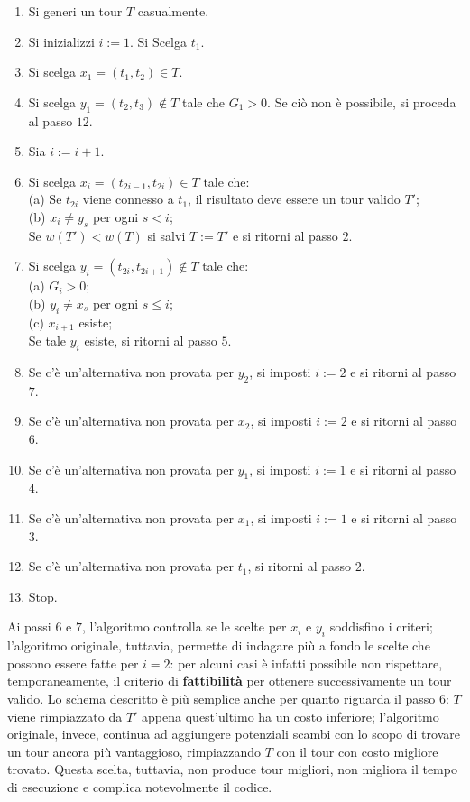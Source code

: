 \begin{algorithm}[H]
\caption{}
\begin{enumerate}
    \item Si generi un tour $T$ casualmente.
    \item Si inizializzi $i:=1$. Si Scelga $t_1$.
    \item Si scelga $x_1=(t_1,t_2) \in T$.
    \item Si scelga $y_1=(t_2, t_3) \notin T$ tale che $G_1>0$. Se ciò non è possibile, si proceda al passo $12$.
    \item Sia $i:=i+1$.
    \item Si scelga $x_i=(t_{2i-1}, t_{2i}) \in T$ tale che:\\
            (a) Se $t_{2i}$ viene connesso a $t_1$, il risultato deve essere un tour valido $T'$;\\
            (b) $x_i\neq{}y_s$ per ogni $s<i$;\\
          Se $w(T') < w(T)$ si salvi $T:=T'$ e si ritorni al passo $2$.
    \item Si scelga $y_i=(t_{2i}, t_{2i+1}) \notin T$ tale che:\\
            (a) $G_i>0$;\\
            (b) $y_i\neq{}x_s$ per ogni $s\leq{}i$;\\
            (c) $x_{i+1}$ esiste;\\
          Se tale $y_i$ esiste, si ritorni al passo $5$.
    \item Se c'è un'alternativa non provata per $y_2$, si imposti $i:=2$ e si ritorni al passo $7$.
    \item Se c'è un'alternativa non provata per $x_2$, si imposti $i:=2$ e si ritorni al passo $6$.
    \item Se c'è un'alternativa non provata per $y_1$, si imposti $i:=1$ e si ritorni al passo $4$.
    \item Se c'è un'alternativa non provata per $x_1$, si imposti $i:=1$ e si ritorni al passo $3$.
    \item Se c'è un'alternativa non provata per $t_1$, si ritorni al passo $2$.
    \item Stop.
\end{enumerate}
\end{algorithm}

Ai passi $6$ e $7$, l'algoritmo controlla se le scelte per $x_i$ e $y_i$ soddisfino i criteri;
l'algoritmo originale, tuttavia, permette di indagare più a fondo le scelte che possono essere fatte
per $i=2$: per alcuni casi è infatti possibile non rispettare, temporaneamente, il criterio di
\textbf{fattibilità} per ottenere successivamente un tour valido. Lo schema descritto è più semplice anche
per quanto riguarda il passo $6$: $T$ viene rimpiazzato da $T'$ appena quest'ultimo ha un costo inferiore;
l'algoritmo originale, invece, continua ad aggiungere potenziali scambi con lo scopo di trovare un tour 
ancora più vantaggioso, rimpiazzando $T$ con il tour con costo migliore trovato. Questa scelta, tuttavia,
non produce tour migliori, non migliora il tempo di esecuzione e complica notevolmente il codice\cite{LKH}.\\


